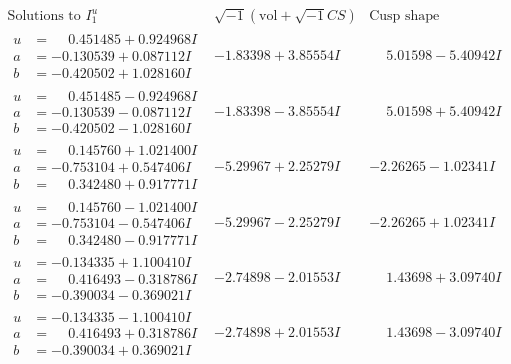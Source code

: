 \documentclass[1p]{elsarticle_modified}
\theoremstyle{definition}
\newcommand{\I}{\sqrt{-1}}
\begin{document}
$$\begin{array}{c|c|c}  
\text{Solutions to }I^u_{1}& \I (\text{vol} + \sqrt{-1}CS) & \text{Cusp shape}\\
 \hline 
\begin{aligned}
u &= \phantom{-}0.451485 + 0.924968 I \\
a &= -0.130539 + 0.087112 I \\
b &= -0.420502 + 1.028160 I\end{aligned}
 & -1.83398 + 3.85554 I & \phantom{-}5.01598 - 5.40942 I \\ \hline\begin{aligned}
u &= \phantom{-}0.451485 - 0.924968 I \\
a &= -0.130539 - 0.087112 I \\
b &= -0.420502 - 1.028160 I\end{aligned}
 & -1.83398 - 3.85554 I & \phantom{-}5.01598 + 5.40942 I \\ \hline\begin{aligned}
u &= \phantom{-}0.145760 + 1.021400 I \\
a &= -0.753104 + 0.547406 I \\
b &= \phantom{-}0.342480 + 0.917771 I\end{aligned}
 & -5.29967 + 2.25279 I & -2.26265 - 1.02341 I \\ \hline\begin{aligned}
u &= \phantom{-}0.145760 - 1.021400 I \\
a &= -0.753104 - 0.547406 I \\
b &= \phantom{-}0.342480 - 0.917771 I\end{aligned}
 & -5.29967 - 2.25279 I & -2.26265 + 1.02341 I \\ \hline\begin{aligned}
u &= -0.134335 + 1.100410 I \\
a &= \phantom{-}0.416493 - 0.318786 I \\
b &= -0.390034 - 0.369021 I\end{aligned}
 & -2.74898 - 2.01553 I & \phantom{-}1.43698 + 3.09740 I \\ \hline\begin{aligned}
u &= -0.134335 - 1.100410 I \\
a &= \phantom{-}0.416493 + 0.318786 I \\
b &= -0.390034 + 0.369021 I\end{aligned}
 & -2.74898 + 2.01553 I & \phantom{-}1.43698 - 3.09740 I \\ \hline\begin{aligned}

\end{aligned}
\end{array}$$
\end{document}
